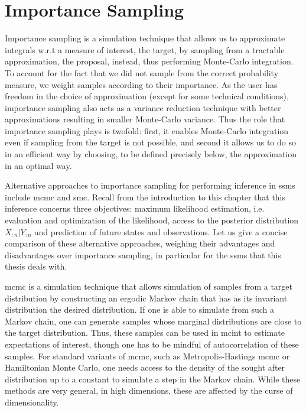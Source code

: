 \section{Importance Sampling}
\label{sec:importance_sampling}
Importance sampling is a simulation technique that allows us to approximate integrals w.r.t a measure of interest, the target, by sampling from a tractable approximation, the proposal, instead, thus performing Monte-Carlo integration. To account for the fact that we did not sample from the correct probability measure, we weight samples according to their importance. As the user has freedom in the choice of approximation (except for some technical conditions), importance sampling also acts as a variance reduction technique with better approximations resulting in smaller Monte-Carlo variance. Thus the role that importance sampling plays is twofold: first, it enables Monte-Carlo integration even if sampling from the target is not possible, and second it allows us to do so in an efficient way by choosing, to be defined precisely below, the approximation in an optimal way.

Alternative approaches to importance sampling for performing inference in \glspl{ssm} include \gls{mcmc} and \gls{smc}. 
Recall from the introduction to this chapter that this inference concerns three objectives: maximum likelihood estimation, i.e. evaluation and optimization of the likelihood, access to the posterior distribution $X_{:n} | Y_{:n}$ and prediction of future states and observations. Let us give a concise comparison of these alternative approaches, weighing their advantages and disadvantages over importance sampling, in particular for the \glspl{ssm} that this thesis deals with. 

\gls{mcmc} \citep{Brooks2011Handbook} is a simulation technique that allows simulation of samples from a target distribution by constructing an ergodic Markov chain that has as its invariant distribution the desired distribution. 
If one is able to simulate from such a Markov chain, one can generate samples whose marginal distributions are close to the target distribution.
Thus, these samples can be used in \gls{mcint} to estimate expectations of interest, though one has to be mindful of autocorrelation of these samples.
For standard variants of \gls{mcmc}, such as Metropolis-Hastings \gls{mcmc} or Hamiltonian Monte Carlo, one needs access to the density of the sought after distribution up to a constant to simulate a step in the Markov chain. While these methods are very general, in high dimensions, these are affected by the curse of dimensionality. 

